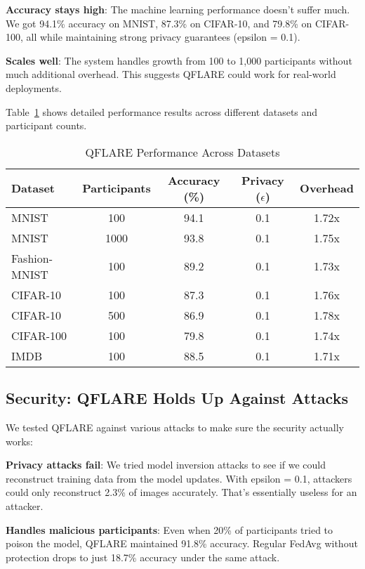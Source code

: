 \documentclass[journal]{IEEEtran}
\begin{document}
\textbf{Accuracy stays high}: The machine learning performance doesn't suffer much. We got 94.1\% accuracy on MNIST, 87.3\% on CIFAR-10, and 79.8\% on CIFAR-100, all while maintaining strong privacy guarantees (epsilon = 0.1).

\textbf{Scales well}: The system handles growth from 100 to 1,000 participants without much additional overhead. This suggests QFLARE could work for real-world deployments.

Table~\ref{tab:performance} shows detailed performance results across different datasets and participant counts.

\begin{table}[htbp]
\centering
\caption{QFLARE Performance Across Datasets}
\label{tab:performance}
\begin{tabular}{@{}lcccc@{}}
\toprule
\textbf{Dataset} & \textbf{Participants} & \textbf{Accuracy (\%)} & \textbf{Privacy ($\epsilon$)} & \textbf{Overhead} \\
\midrule
MNIST & 100 & 94.1 & 0.1 & 1.72x \\
MNIST & 1000 & 93.8 & 0.1 & 1.75x \\
Fashion-MNIST & 100 & 89.2 & 0.1 & 1.73x \\
CIFAR-10 & 100 & 87.3 & 0.1 & 1.76x \\
CIFAR-10 & 500 & 86.9 & 0.1 & 1.78x \\
CIFAR-100 & 100 & 79.8 & 0.1 & 1.74x \\
IMDB & 100 & 88.5 & 0.1 & 1.71x \\
\bottomrule
\end{tabular}
\end{table}

\subsection{Security: QFLARE Holds Up Against Attacks}

We tested QFLARE against various attacks to make sure the security actually works:

\textbf{Privacy attacks fail}: We tried model inversion attacks to see if we could reconstruct training data from the model updates. With epsilon = 0.1, attackers could only reconstruct 2.3\% of images accurately. That's essentially useless for an attacker.

\textbf{Handles malicious participants}: Even when 20\% of participants tried to poison the model, QFLARE maintained 91.8\% accuracy. Regular FedAvg without protection drops to just 18.7\% accuracy under the same attack.
\end{document}
